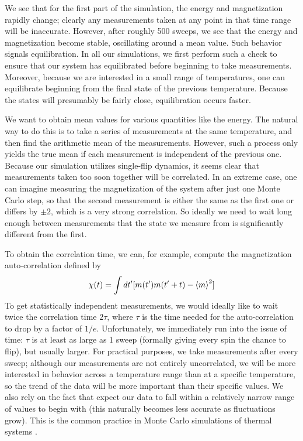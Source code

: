 \documentclass[twocolumn,aps]{revtex4-1} %
\begin{document}
We see that for the first part of the simulation, the energy and magnetization rapidly change; clearly any measurements taken at any point in that time range will be inaccurate. However, after roughly 500 sweeps, we see that the energy and magnetization become stable, oscillating around a mean value. Such behavior signals equilibration. In all our simulations, we first perform such a check to ensure that our system has equilibrated before beginning to take measurements. Moreover, because we are interested in a small range of temperatures, one can equilibrate beginning from the final state of the previous temperature. Because the states will presumably be fairly close, equilibration occurs faster.

We want to obtain mean values for various quantities like the energy. The natural way to do this is to take a series of measurements at the same temperature, and then find the arithmetic mean of the measurements. However, such a process only yields the true mean if each measurement is independent of the previous one. Because our simulation utilizes single-flip dynamics, it seems clear that measurements taken too soon together will be correlated. In an extreme case, one can imagine measuring the magnetization of the system after just one Monte Carlo step, so that the second measurement is either the same as the first one or differs by $\pm 2$, which is a very strong correlation. So ideally we need to wait long enough between measurements that the state we measure from is significantly different from the first.

To obtain the correlation time, we can, for example, compute the magnetization auto-correlation defined by
\begin{align}
\chi(t) = \int dt'[m(t')m(t'+t)-\braket{m}^2]
\end{align}
To get statistically independent measurements, we would ideally like to wait twice the correlation time $2\tau$, where $\tau$ is the time needed for the auto-correlation to drop by a factor of ${1}/{e}$. Unfortunately, we immediately run into the issue of time: $\tau$ is at least as large as 1 sweep (formally giving every spin the chance to flip), but usually larger. For practical purposes, we take measurements after every sweep; although our measurements are not entirely uncorrelated, we will be more interested in behavior across a temperature range than at a specific temperature, so the trend of the data will be more important than their specific values. We also rely on the fact that expect our data to fall within a relatively narrow range of values to begin with (this naturally becomes less accurate as fluctuations grow). This is the common practice in Monte Carlo simulations of thermal systems \cite{mcmethods}.
\end{document}
